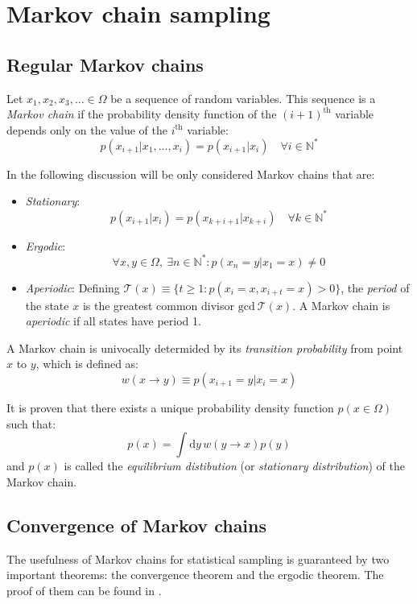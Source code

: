 \section{Markov chain sampling}

\subsection*{Regular Markov chains}
Let $x_1, x_2, x_3, \ldots \in \Omega$ be a sequence of random variables.
This sequence is a \emph{Markov chain} if the probability density function of the $(i+1)^\mathrm{th}$
variable depends only on the value of the $i^\mathrm{th}$ variable:
\[
    p(x_{i+1}|x_1, \ldots, x_i) = p(x_{i+1}|x_i) \quad \forall i\in\mathbb N^*
\]

In the following discussion will be only considered Markov chains that are:
\begin{itemize}
    \item \emph{Stationary}:
        \[
            p(x_{i+1}|x_i) = p(x_{k+i+1}|x_{k+i}) \quad \forall k\in\mathbb N^*
        \]
    \item \emph{Ergodic}:
        \[
            \forall x,y \in \Omega,\ \exists n\in\mathbb N^* : p(x_n=y|x_1=x) \neq 0
        \]
    \item \emph{Aperiodic}:
        Defining $\mathcal T(x) \equiv \{t\geq1:p(x_i=x,x_{i+t}=x)>0\}$,
        the \emph{period} of the state $x$ is the greatest common divisor $\mathrm{gcd}\ \mathcal T(x)$.
        A Markov chain is \emph{aperiodic} if all states have period 1.
\end{itemize}

A Markov chain is univocally determided by its \emph{transition probability} from point $x$ to $y$, which is defined as:
\begin{equation}\label{eq:transition}
    w(x \to y) \equiv p(x_{i+1}=y|x_i=x)
\end{equation}

It is proven \cite{mc-mt} that there exists a unique probability density function $p(x\in\Omega)$
such that:
\begin{equation}\label{eq:equilibrium}
	p(x) = \int\mathrm dy\,w(y \to x)p(y)
\end{equation}
and $p(x)$ is called the \emph{equilibrium distibution} (or \emph{stationary distribution}) of the Markov chain.

\subsection*{Convergence of Markov chains}
The usefulness of Markov chains for statistical sampling is guaranteed by two important theorems:
the convergence theorem and the ergodic theorem. The proof of them can be found in \cite{mc-mt}.

